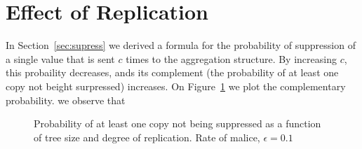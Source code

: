 \documentclass[10pt,twocolumn]{style}
\begin{document}
  \section{Effect of Replication}
  \label{sec:replicate}
  In Section~\ref{sec:supress} we derived a formula for the
  probability of suppression of a single value that is sent $c$ times
  to the aggregation structure. By increasing $c$, this probaility
  decreases, ands its complement (the probability of at least one copy
  not beight surpressed) increases. On Figure~\ref{fig:pb} we plot the
  complementary probability. we observe that 

  \begin{figure}[htpb!]
    \begin{center}
      \caption{\label{fig:pb} Probability of at least one copy not
      being suppressed as a function of tree size and degree of
      replication. Rate of malice, $\epsilon=0.1$}
    \end{center}
  \end{figure}
  

  
  
  




\end{document}
